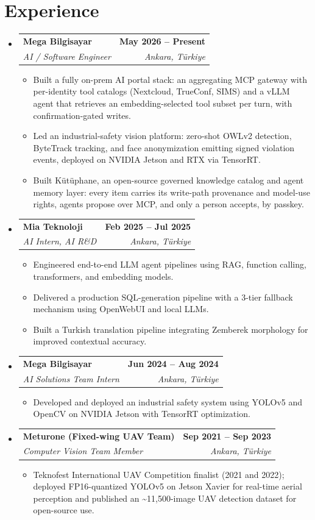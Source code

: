 \documentclass[letterpaper,10pt]{article}
\makeatletter
\newcommand{\resumeItem}[1]{\item\small{{#1 \vspace{-3pt}}}}
\newcommand{\resumeSubheading}[4]{\vspace{-2pt}\item
  \begin{tabular*}{1.0\textwidth}[t]{l@{\extracolsep{\fill}}r}
    \textbf{#1} & \textbf{\small #2} \\
    \textit{\small#3} & \textit{\small #4} \\
  \end{tabular*}\vspace{-6pt}}
\newcommand{\resumeSubHeadingListStart}{\begin{itemize}[leftmargin=0.0in, label={}]}
\newcommand{\resumeSubHeadingListEnd}{\end{itemize}}
\newcommand{\resumeItemListStart}{\begin{itemize}[leftmargin=0.15in, label={\textbullet}]}
\newcommand{\resumeItemListEnd}{\end{itemize}\vspace{1pt}}
\makeatother
\begin{document}
\section{Experience}
\resumeSubHeadingListStart
\resumeSubheading{Mega Bilgisayar}{May 2026 -- Present}{AI / Software Engineer}{Ankara, Türkiye}
\resumeItemListStart
\resumeItem{Built a fully on-prem AI portal stack: an aggregating MCP gateway with per-identity tool catalogs (Nextcloud, TrueConf, SIMS) and a vLLM agent that retrieves an embedding-selected tool subset per turn, with confirmation-gated writes.}
\resumeItem{Led an industrial-safety vision platform: zero-shot OWLv2 detection, ByteTrack tracking, and face anonymization emitting signed violation events, deployed on NVIDIA Jetson and RTX via TensorRT.}
\resumeItem{Built Kütüphane, an open-source governed knowledge catalog and agent memory layer: every item carries its write-path provenance and model-use rights, agents propose over MCP, and only a person accepts, by passkey.}
\resumeItemListEnd
\resumeSubheading{Mia Teknoloji}{Feb 2025 -- Jul 2025}{AI Intern, AI R\&D}{Ankara, Türkiye}
\resumeItemListStart
\resumeItem{Engineered end-to-end LLM agent pipelines using RAG, function calling, transformers, and embedding models.}
\resumeItem{Delivered a production SQL-generation pipeline with a 3-tier fallback mechanism using OpenWebUI and local LLMs.}
\resumeItem{Built a Turkish translation pipeline integrating Zemberek morphology for improved contextual accuracy.}
\resumeItemListEnd
\resumeSubheading{Mega Bilgisayar}{Jun 2024 -- Aug 2024}{AI Solutions Team Intern}{Ankara, Türkiye}
\resumeItemListStart
\resumeItem{Developed and deployed an industrial safety system using YOLOv5 and OpenCV on NVIDIA Jetson with TensorRT optimization.}
\resumeItemListEnd
\resumeSubheading{Meturone (Fixed-wing UAV Team)}{Sep 2021 -- Sep 2023}{Computer Vision Team Member}{Ankara, Türkiye}
\resumeItemListStart
\resumeItem{Teknofest International UAV Competition finalist (2021 and 2022); deployed FP16-quantized YOLOv5 on Jetson Xavier for real-time aerial perception and published an \textasciitilde{}11,500-image UAV detection dataset for open-source use.}
\resumeItemListEnd
\resumeSubHeadingListEnd
\vspace{-7pt}
\end{document}
